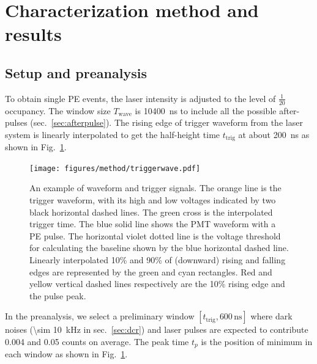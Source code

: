 \section{Characterization method and results}
\label{Method}
\subsection{Setup and preanalysis}
\label{sec:laserstage}

To obtain single PE events, the laser intensity is adjusted to the level of $\frac{1}{20}$ occupancy. The window size $T_{\mathrm{wave}}$ is \SI{10400}{ns} to include all the possible after-pulses (sec.~\ref{sec:afterpulse}). The rising edge of trigger waveform from the laser system is linearly interpolated to get the half-height time $t_{\mathrm{trig}}$ at about \SI{200}{ns} as shown in Fig.~\ref{fig:triggertime}.
\begin{figure}[!htbp]
    \centering
    \texttt{[image: figures/method/triggerwave.pdf]}
    \caption{An example of waveform and trigger signals. The orange line is the trigger waveform, with its high and low voltages indicated by two black horizontal dashed lines. The green cross is the interpolated trigger time. The blue solid line shows the PMT waveform with a PE pulse. The horizontal violet dotted line is the voltage threshold for calculating the baseline shown by the blue horizontal dashed line. Linearly interpolated 10\% and 90\% of (downward) rising and falling edges are represented by the green and cyan rectangles. Red and yellow vertical dashed lines respectively are the 10\% rising edge and the pulse peak.}
    \label{fig:triggertime}
\end{figure}


In the preanalysis, we select a preliminary window $[t_{\mathrm{trig}},600\,\mathrm{ns}]$ where dark noises (\SI{\sim 10}{kHz} in sec.~\ref{sec:dcr}) and laser pulses are expected to contribute 0.004 and 0.05 counts on average. The peak time $t_p$ is the position of minimum in each window as shown in Fig.~\ref{fig:triggertime}.



